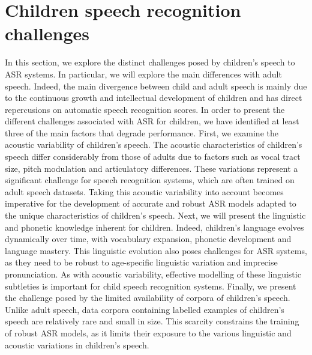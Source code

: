 \section{Children speech  recognition challenges}%
\label{section:Children_seepch_challenges}
In this section, we explore the distinct challenges posed by children's speech to ASR systems. In particular, we will explore the main differences with adult speech.  Indeed, the main divergence between child and adult speech is mainly due to the continuous growth and intellectual development of children and has direct repercusions on automatic speech recognition scores. In order to present the different challenges associated with ASR for children, we have identified at least three of the main factors that degrade performance.
First, we examine the acoustic variability of children's speech. The acoustic characteristics of children's speech differ considerably from those of adults due to factors such as vocal tract size, pitch modulation and articulatory differences. These variations represent a significant challenge for speech recognition systems, which are often trained on adult speech datasets. Taking this acoustic variability into account becomes imperative for the development of accurate and robust ASR models adapted to the unique characteristics of children's speech.
Next, we will present the linguistic and phonetic knowledge inherent for children. Indeed, children's language evolves dynamically over time, with vocabulary expansion, phonetic development and language mastery.  This linguistic evolution also poses challenges for ASR systems, as they need to be robust to age-specific linguistic variation and imprecise pronunciation. As with acoustic variability, effective modelling of these linguistic subtleties is important for child speech recognition systems.
Finally, we present the challenge posed by the limited availability of corpora of children's speech. Unlike adult speech, data corpora containing labelled examples of children's speech are relatively rare and small in size. This scarcity constrains the training of robust ASR models, as it limits their exposure to the various linguistic and acoustic variations in children's speech.

